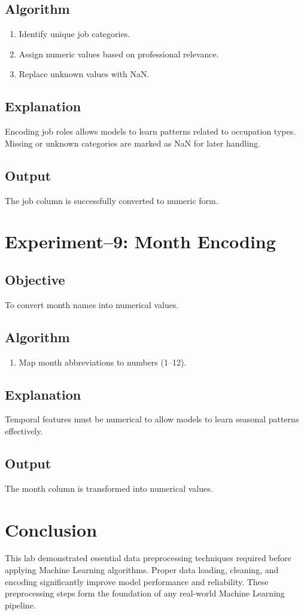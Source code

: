\documentclass[11pt]{article}
\begin{document}
\subsection*{Algorithm}
\begin{enumerate}
    \item Identify unique job categories.
    \item Assign numeric values based on professional relevance.
    \item Replace unknown values with NaN.
\end{enumerate}

\subsection*{Explanation}
Encoding job roles allows models to learn patterns related to occupation types. Missing or unknown categories are marked as NaN for later handling.

\subsection*{Output}
The job column is successfully converted to numeric form.

\section{Experiment--9: Month Encoding}

\subsection*{Objective}
To convert month names into numerical values.

\subsection*{Algorithm}
\begin{enumerate}
    \item Map month abbreviations to numbers (1--12).
\end{enumerate}

\subsection*{Explanation}
Temporal features must be numerical to allow models to learn seasonal patterns effectively.

\subsection*{Output}
The month column is transformed into numerical values.

\section{Conclusion}
This lab demonstrated essential data preprocessing techniques required before applying Machine Learning algorithms. Proper data loading, cleaning, and encoding significantly improve model performance and reliability. These preprocessing steps form the foundation of any real-world Machine Learning pipeline.
\end{document}
